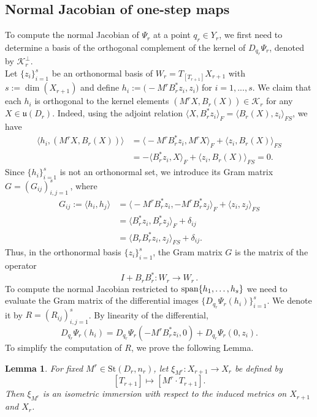 \documentclass{article}
\newtheorem{lemma}[theorem]{Lemma}
\theoremstyle{definition}
\newcommand{\St}{\mathrm{St}}
\begin{document}
\subsection{Normal Jacobian of one-step maps}
To compute the normal Jacobian of $\Psi_r$ at a point $q_r \in Y_r$, we first need to determine a basis of the orthogonal complement of the kernel of $D_{q_r}\Psi_r$, denoted by $\mathcal K_r^{\perp}$. \\

Let
\(\{z_i\}_{i=1}^{s}\) be an orthonormal basis of \(W_r 
=T_{[T_{r+1}]}X_{r+1}\) with $s:=\dim(X_{r+1})$ and define $h_i:=\bigl(-M^rB_r^*z_i,z_i\bigr)$ for $i=1, ..., s$.
We claim that each \(h_i\) is orthogonal to the kernel elements \((M^rX,B_r(X)) \in \mathcal K_r\) for any $X\in\mathfrak u(D_r)$. Indeed, using the adjoint relation $\langle X,B_r^*z_i\rangle_{F}
=
\langle B_r(X),z_i\rangle_{FS}$, we have
\begin{align*}
\big\langle h_i,(M^rX,B_r(X))\big\rangle
&=
\big\langle -M^rB_r^*z_i,M^rX\big\rangle_{F}
+
\big\langle z_i,B_r(X)\big\rangle_{FS} \\
&=
-\big\langle B_r^*z_i,X\big\rangle_{F}
+
\big\langle z_i,B_r(X)\big\rangle_{FS}= 0.
\end{align*}
Since $\{h_i\}_{i=1}^{s}$ is not an orthonormal set, we introduce its Gram matrix $G=(G_{ij})_{i,j=1}^s$\,, where
\begin{align*}
G_{ij} :=\langle h_i,h_j\rangle
&=
\big\langle -M^rB_r^*z_i,-M^rB_r^*z_j\big\rangle_{F}
+
\langle z_i,z_j\rangle_{FS} \\
&=
\langle B_r^*z_i,B_r^*z_j\rangle_{F}
+
\delta_{ij} \\
&=
\langle B_rB_r^*z_i,z_j\rangle_{FS}
+
\delta_{ij}.
\end{align*}
Thus, in the orthonormal basis \(\{z_i\}_{i=1}^{s}\), the Gram matrix \(G\) is the matrix of the operator
\[
I+B_rB_r^*:W_r\to W_r\,.
\]
To compute the normal Jacobian restricted to ${\rm span}\{h_1,\dots,h_s\}$ we need to evaluate the Gram matrix of the differential images $\{D_{q_r}\Psi_r(h_i)\}_{i=1}^s$. We denote it by $R=(R_{ij})_{i,j=1}^s$. By linearity of the differential,
\begin{equation}\label{eq:diff_lin}
    D_{q_r}\Psi_r(h_i)
=
D_{q_r}\Psi_r(-M^rB_r^*z_i,0)
+
D_{q_r}\Psi_r(0,z_i).
\end{equation}
To simplify the computation of $R$, we prove the following Lemma.
\begin{lemma}\label{lem:xi_M_isometric}
For fixed \(M^r\in \St(D_r,n_r)\), let $\xi_{M^r}:X_{r+1}\to X_r$ be defined by
\[
[T_{r+1}]\longmapsto [M^r \cdot T_{r+1}].
\]
Then \(\xi_{M^r}\) is an isometric immersion with respect to the induced
metrics on \(X_{r+1}\) and \(X_r\).
\end{lemma}
\end{document}
